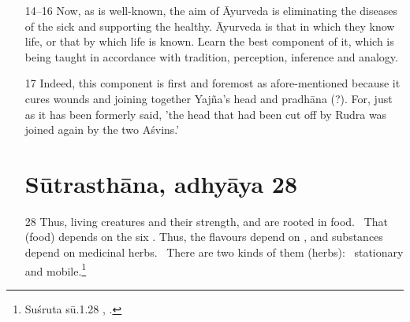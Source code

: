 \documentclass[12pt]{article}
\begin{document}
\begin{itemize}
        \item[14–16] Now, as is well-known, the aim of Āyurveda is eliminating the diseases of the sick and supporting the healthy.  Āyurveda is that in which they know life, or that by which life is known. Learn the best component of it, which is being taught in accordance with tradition, perception, inference and analogy.
        
        \item[17] Indeed, this component is first and foremost as afore-mentioned because it cures wounds and joining together Yajña's head and pradhāna (?). For, just as it has been formerly said,  'the head that had been cut off by Rudra was joined again by the two Aśvins.'
    
    
    

  
    \newpage

\section{Sūtrasthāna, adhyāya 28}
    
    \item [28] Thus, living creatures and their strength,
 and  are rooted in food.  That
(food) depends on the six . Thus, the flavours depend
on , and substances depend on medicinal herbs. 
There are two kinds of them (herbs):  stationary and mobile.\footnote{Suśruta
sū.1.28 \cite[I, 21]{shar-susr}, \cite[7]{susr-trikamji2004}.}
\end{itemize}

\nocite{*}

\newpage

    \printshorthands

    \printbibliography[notkeyword=edition,
        notkeyword=shorthand]
    
    
    \newpage
    
    \printindex[lexical]

    
\end{document}
